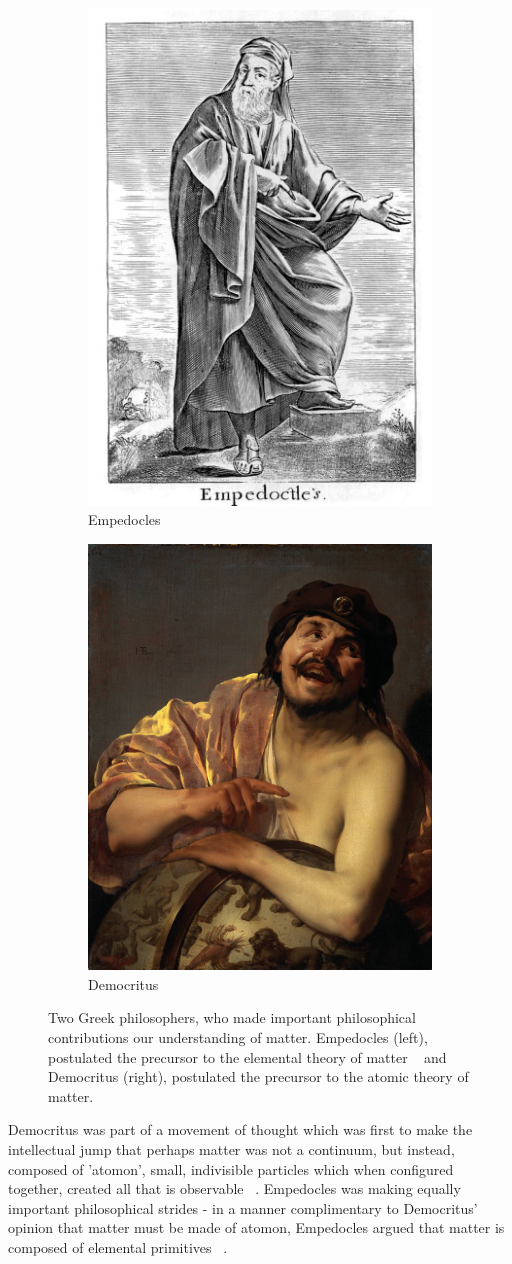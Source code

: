 \begin{figure}[ht]
	\centering
	\begin{subfigure}{.5\textwidth}
		\centering
		\includegraphics[width=0.4\linewidth]{figures/empedocles.jpg}
		\caption{Empedocles~\cite{Stanley1655}}
		\label{fig:empedocles}
	\end{subfigure}%
	\begin{subfigure}{0.5\textwidth}
		\centering
		\includegraphics[width=0.4\linewidth]{figures/democritus.jpg}
		\caption{Democritus~\cite{Brugghen1628}}
		\label{fig:democritus}
	\end{subfigure}
	\caption{ Two Greek philosophers, who made important philosophical
		contributions our understanding of matter. Empedocles (left), postulated the
		precursor to the elemental theory of matter ~\needcite{} and Democritus
	(right), postulated the precursor to the atomic theory of matter.  }
	\label{fig:atomists}
\end{figure}

Democritus was part of a movement of thought which was first to make the
intellectual jump that perhaps matter was not a continuum, but instead, composed
of 'atomon', small, indivisible particles which when configured together, created
all that is observable ~\needcite{}. Empedocles was making equally important
philosophical strides - in a manner complimentary to Democritus' opinion that
matter must be made of atomon, Empedocles argued that matter is composed of
elemental primitives ~\needcite{}.

